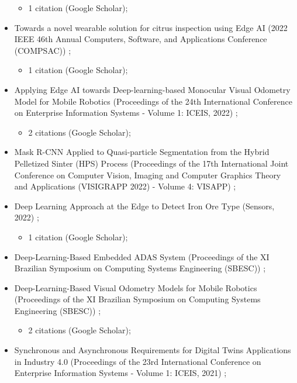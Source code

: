 \begin{itemize}
    \begin{itemize}
        \item 1 citation (Google Scholar);
    \end{itemize}
    \item Towards a novel wearable solution for citrus inspection using Edge AI (2022 IEEE 46th Annual Computers, Software, and Applications Conference (COMPSAC)) \cite{da2022towards};
    \begin{itemize}
        \item 1 citation (Google Scholar);
    \end{itemize}
    \item Applying Edge AI towards Deep-learning-based Monocular Visual Odometry Model for Mobile Robotics (Proceedings of the 24th International Conference on Enterprise Information Systems - Volume 1: ICEIS, 2022) \cite{de2022applying};
    \begin{itemize}
        \item 2 citations (Google Scholar);
    \end{itemize}
    \item Mask R-CNN Applied to Quasi-particle Segmentation from the Hybrid Pelletized Sinter (HPS) Process (Proceedings of the 17th International Joint Conference on Computer Vision, Imaging and Computer Graphics Theory and Applications (VISIGRAPP 2022) - Volume 4: VISAPP) \cite{visapp22hps};
    \item Deep Learning Approach at the Edge to Detect Iron Ore Type (Sensors, 2022) \cite{klippel2022deep};
    \begin{itemize}
        \item 1 citation (Google Scholar);
    \end{itemize}
    \item Deep-Learning-Based Embedded ADAS System (Proceedings of the XI Brazilian Symposium on Computing Systems Engineering (SBESC)) \cite{de2021deep};
    \item Deep-Learning-Based Visual Odometry Models for Mobile Robotics (Proceedings of the XI Brazilian Symposium on Computing Systems Engineering (SBESC)) \cite{de2021deep2};
    \begin{itemize}
        \item 2 citations (Google Scholar);
    \end{itemize}
    \item Synchronous and Asynchronous Requirements for Digital Twins Applications in Industry 4.0 (Proceedings of the 23rd International Conference on Enterprise Information Systems - Volume 1: ICEIS, 2021) \cite{iceis21dt};

\end{itemize}
